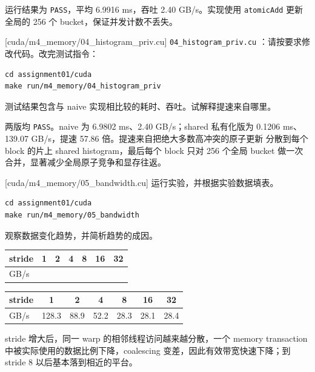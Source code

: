 \documentclass[11pt,a4paper,fontset=fandol]{ctexart}
\begin{document}
\begin{answer}
运行结果为 \texttt{PASS}，平均 6.9916 ms，吞吐 2.40 GB/s。实现使用
\texttt{atomicAdd} 更新全局的 256 个 bucket，保证并发计数不丢失。
\end{answer}

[cuda/m4\_memory/04\_histogram\_priv.cu]
\texttt{04\_histogram\_priv.cu} ：请按要求修改代码。改完测试指令：

\begin{lstlisting}
cd assignment01/cuda
make run/m4_memory/04_histogram_priv
\end{lstlisting}

测试结果包含与 naive 实现相比较的耗时、吞吐。试解释提速来自哪里。

\begin{answer}
两版均 \texttt{PASS}。naive 为 6.9802 ms、2.40 GB/s；shared 私有化版为
0.1206 ms、139.07 GB/s，提速 57.86 倍。提速来自把绝大多数高冲突的原子更新
分散到每个 block 的片上 shared histogram，最后每个 block 只对 256 个全局
bucket 做一次合并，显著减少全局原子竞争和显存往返。
\end{answer}

[cuda/m4\_memory/05\_bandwidth.cu]
运行实验，并根据实验数据填表。

\begin{lstlisting}
cd assignment01/cuda
make run/m4_memory/05_bandwidth
\end{lstlisting}

观察数据变化趋势，并简析趋势的成因。

\begin{center}\small
\begin{tabular}{@{}lcccccc@{}}
\toprule
stride & 1 & 2 & 4 & 8 & 16 & 32 \\
\midrule
GB/s & & & & & & \\
\bottomrule
\end{tabular}
\end{center}

\begin{answer}
\begin{center}\small
\begin{tabular}{@{}lcccccc@{}}
\toprule
stride & 1 & 2 & 4 & 8 & 16 & 32 \\
\midrule
GB/s & 128.3 & 88.9 & 52.2 & 28.3 & 28.1 & 28.4 \\
\bottomrule
\end{tabular}
\end{center}
stride 增大后，同一 warp 的相邻线程访问越来越分散，一个 memory transaction
中被实际使用的数据比例下降，coalescing 变差，因此有效带宽快速下降；到
stride 8 以后基本落到相近的平台。
\end{answer}
\end{document}
